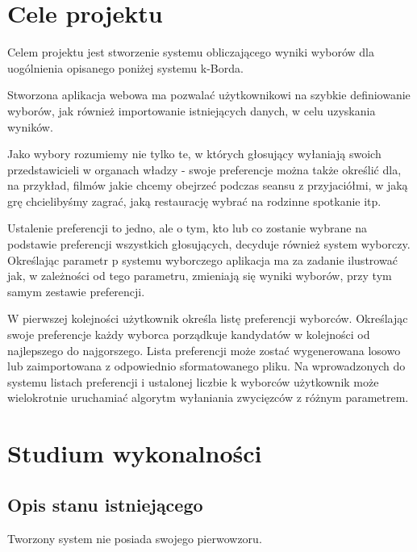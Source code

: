 \documentclass[pdflatex,11pt]{../aghdoc_version2}
\author{Tomasz Kasprzyk, Daniel Ogiela, Jakub Stępak}
\date{2016}
\begin{document}
\titlepages

\tableofcontents
\clearpage

%
%
\chapter{Cele projektu}
\label{cha:cele_projektu}
Celem projektu jest stworzenie systemu obliczającego wyniki wyborów dla uogólnienia opisanego poniżej systemu k-Borda. 

Stworzona aplikacja webowa ma pozwalać użytkownikowi na szybkie definiowanie wyborów, jak również importowanie istniejących danych, w celu uzyskania wyników. 

Jako wybory rozumiemy nie tylko te, w których głosujący wyłaniają swoich przedstawicieli w organach władzy - swoje preferencje można także określić dla, na przykład, filmów jakie chcemy obejrzeć podczas seansu z przyjaciółmi, w jaką grę chcielibyśmy zagrać, jaką restaurację wybrać na rodzinne spotkanie itp.

Ustalenie preferencji to jedno, ale o tym, kto lub co zostanie wybrane na podstawie preferencji wszystkich głosujących, decyduje również system wyborczy.
Określając parametr p systemu wyborczego aplikacja ma za zadanie ilustrować jak, w zależności od tego parametru, zmieniają się wyniki wyborów, przy tym samym zestawie preferencji.

W pierwszej kolejności użytkownik określa listę preferencji wyborców. Określając swoje preferencje każdy wyborca porządkuje kandydatów w kolejności od najlepszego do najgorszego. Lista preferencji może zostać wygenerowana losowo lub zaimportowana z odpowiednio sformatowanego pliku.
Na wprowadzonych do systemu listach preferencji i ustalonej liczbie k wyborców użytkownik może wielokrotnie uruchamiać algorytm wyłaniania zwycięzców z różnym parametrem.


\chapter{Studium wykonalności}
\label{cha:studium_wykonalnosci}

\section{Opis stanu istniejącego}
\label{sec:opis_stanu_istniejacego}
Tworzony system nie posiada swojego pierwowzoru.
\end{document}
